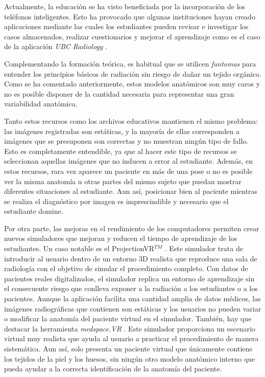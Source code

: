 Actualmente, la educación se ha visto beneficiada por la incorporación de los teléfonos inteligentes. Esto ha provocado que algunas instituciones hayan creado aplicaciones mediante las cuales los estudiantes pueden revisar e investigar los casos almacenados, realizar cuestionarios y mejorar el aprendizaje como es el caso de la aplicación \emph{UBC Radiology} \cite{Spouge2017}. %

Complementando la formación teórica, es habitual que se utilicen \emph{fantomas} para entender los principios básicos de radiación sin riesgo de dañar un tejido orgánico. Como se ha comentado anteriormente, estos modelos anatómicos son muy caros y no es posible disponer de la cantidad necesaria para representar una gran variabilidad anatómica.

Tanto estos recursos como los archivos educativos mantienen el mismo problema: las imágenes registradas son estáticas, y la mayoría de ellas corresponden a imágenes que se presuponen son correctas y no muestran ningún tipo de fallo. Esto es completamente entendible, ya que al hacer este tipo de recursos se seleccionan aquellas imágenes que no inducen a error al estudiante. Además, en estos recursos, rara vez aparece un paciente en más de una pose o no es posible ver la misma anatomía u otras partes del mismo sujeto que puedan mostrar diferentes situaciones al estudiante. Aun así, posicionar bien al paciente mientras se realiza el diagnóstico por imagen es imprescindible y necesario que el estudiante domine. 


Por otra parte, las mejoras en el rendimiento de los computadores permiten crear nuevos simuladores que mejoran y reducen el tiempo de aprendizaje de los estudiantes. Un caso notable es el  ProjectionVR$^{TM}$ \cite{shanahan2016student}. Este simulador trata de introducir al usuario dentro de un entorno 3D realista que reproduce una sala de radiología con el objetivo de simular el procedimiento completo. Con datos de pacientes reales digitalizados, el simulador replica un entorno de aprendizaje sin el consecuente riesgo que conlleva exponer a la radiación a los estudiantes o a los pacientes. Aunque la aplicación facilita una cantidad amplia de datos médicos, las imágenes radiográficas que contienen son estáticas y los usuarios no pueden variar o modificar la anatomía del paciente virtual en el simulador. También, hay que destacar la herramienta \emph{medspace.VR} \cite{medspace}. Este simulador proporciona un escenario virtual muy realista que ayuda al usuario a practicar el procedimiento de manera sistemática. Aun así, solo presenta un paciente virtual que únicamente contiene los tejidos de la piel y los huesos, sin ningún otro modelo anatómico interno que pueda ayudar a la correcta identificación de la anatomía del paciente.


